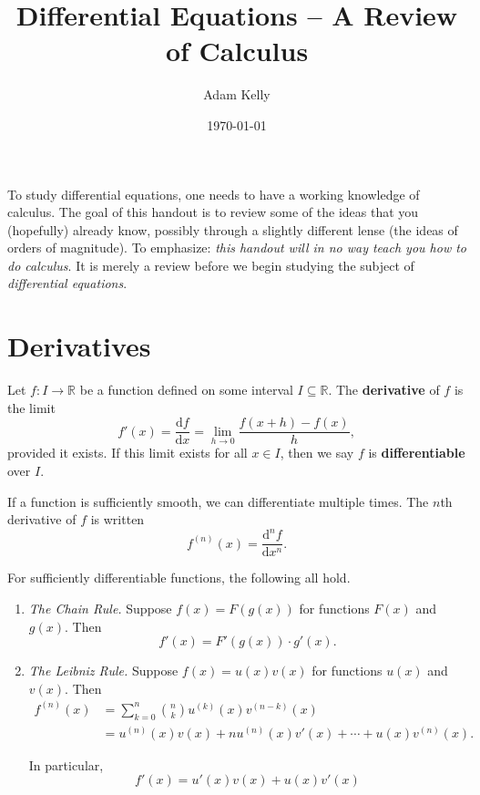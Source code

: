 \documentclass[]{scrartcl}
\newcommand{\vocab}[1]{\textbf{\color{MidnightBlue} #1}}
\newcommand{\dd}{\mathrm{d}}
\newcommand{\R}{\mathbb{R}}
\begin{document}
\title{Differential Equations -- A Review of Calculus}
\author{Adam Kelly}
\date{\today}

\maketitle

To study differential equations, one needs to have a working knowledge of calculus. The goal of this handout is to review some of the ideas that you (hopefully) already know, possibly through a slightly different lense (the ideas of orders of magnitude). 
To emphasize: \emph{this handout will in no way teach you how to do calculus}. It is merely a review before we begin studying the subject of \emph{differential equations}.

\section*{Derivatives}

\begin{definition}[Derivative]
	Let $f: I \rightarrow \R$ be a function defined on some interval $I \subseteq \R$. The \vocab{derivative} of $f$ 
	is the limit
	$$
	f'(x) = \frac{\dd f}{\dd x} = \lim_{h \to 0} \frac{f(x + h) - f(x)}{h},
	$$
	provided it exists.
	If this limit exists for all $x \in I$, then we say $f$ is \vocab{differentiable} over $I$. 
\end{definition}


If a function is sufficiently smooth, we can differentiate multiple times. The $n$th derivative of $f$ is written
$$
f^{(n)}(x) = \frac{\dd^n f}{\dd x^n}.
$$

\begin{theorem}
	For sufficiently differentiable functions, the following all hold.
	\begin{enumerate}[label=(\roman*)]
		\item \emph{The Chain Rule.} Suppose $f(x) = F(g(x))$ for functions $F(x)$ and $g(x)$. Then
		$$
			f'(x) = F'(g(x))\cdot g'(x).
		$$
		\item \emph{The Leibniz Rule.} 	Suppose $f(x) = u(x)v(x)$ for functions $u(x)$ and $v(x)$. Then
		\begin{align*}
			f^{(n)}(x) &= \sum_{k = 0}^n \binom{n}{k} u^{(k)} (x) v^{(n - k)}(x)\\
			&= u^{(n)}(x) v(x) + n u^{(n)}(x) v'(x) + \cdots + u(x)v^{(n)}(x).
		\end{align*}

		In particular, 
		$$
		f'(x) = u'(x)v(x) + u(x)v'(x)
		$$
	\end{enumerate}
\end{theorem}
\end{document}
